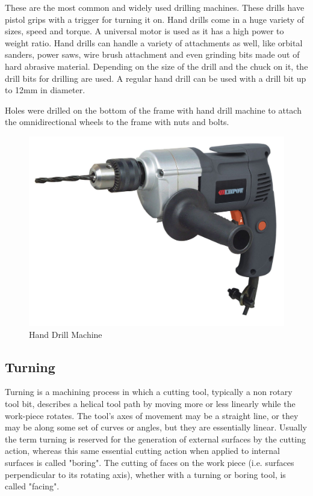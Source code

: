 These are the most common and widely used drilling machines. These drills have pistol grips with a trigger for turning it on. Hand drills come in a huge variety of sizes, speed and torque. A universal motor is used as it has a high power to weight ratio. Hand drills can handle a variety of attachments as well, like orbital sanders, power saws, wire brush attachment and even grinding bits made out of hard abrasive material. Depending on the size of the drill and the chuck on it, the drill bits for drilling are used. A regular hand drill can be used with a drill bit up to 12mm in diameter.

Holes were drilled on the bottom of the frame with hand drill machine to attach the omnidirectional wheels to the frame with nuts and bolts. 

\begin{figure}[h!]
    \centering
    \includegraphics[scale=0.5]{Hand drill machine.jpg}
    \caption{Hand Drill Machine}
    \label{fig:Hand Drill Machine}
\end{figure}



\subsection{Turning} \label{Turning}
Turning is a machining process in which a cutting tool, typically a non rotary tool bit, describes a helical tool path by moving more or less linearly while the work-piece rotates. The tool's axes of movement may be a straight line, or they may be along some set of curves or angles, but they are essentially linear. Usually the term turning is reserved for the generation of external surfaces by the cutting action, whereas this same essential cutting action when applied to internal surfaces is called "boring". The cutting of faces on the work piece (i.e. surfaces perpendicular to its rotating axis), whether with a turning or boring tool, is called "facing".

